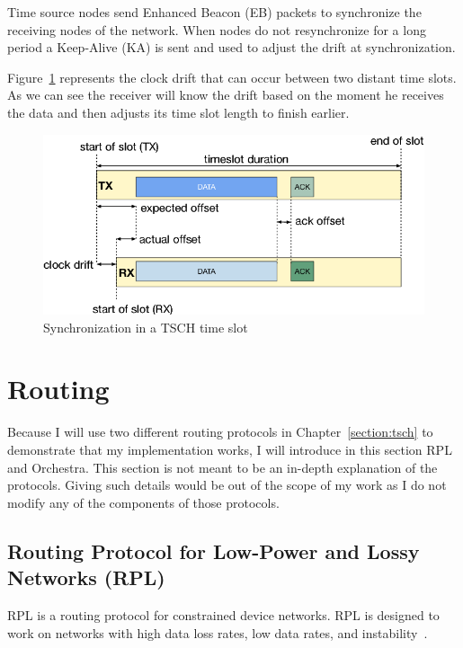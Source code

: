 Time source nodes send Enhanced Beacon (EB) packets to synchronize the receiving
nodes of the network. When nodes do not resynchronize for a long period
a Keep-Alive (KA) is sent and used to adjust the drift at synchronization.

Figure~\ref{fig:sync} represents the clock drift that can occur between two
distant time slots.
As we can see the receiver will know the drift based on the moment he receives
the data and then adjusts its time slot length to finish earlier.

\begin{figure}[H]
  \centering
  \includegraphics[width=\textwidth]{thesis.tex/chapters/context/fig/sync.png}
  \caption{Synchronization in a TSCH time slot\cite{TELESHERMETO201784}\label{fig:sync}}
\end{figure}

\section{Routing}

Because I will use two different routing protocols in
Chapter~\ref{section:tsch} to demonstrate that my implementation works, I will 
introduce in this section RPL and Orchestra.
This section is not meant to be an in-depth explanation of the protocols.
Giving such details would be out of the scope of my work as I do not modify any
of the components of those protocols.

\subsection{Routing Protocol for Low-Power and Lossy Networks (RPL)}

RPL is a routing protocol for constrained device networks.
RPL is designed to work on networks with high data loss rates, low data rates, and
instability~\cite{rfc6550}.

